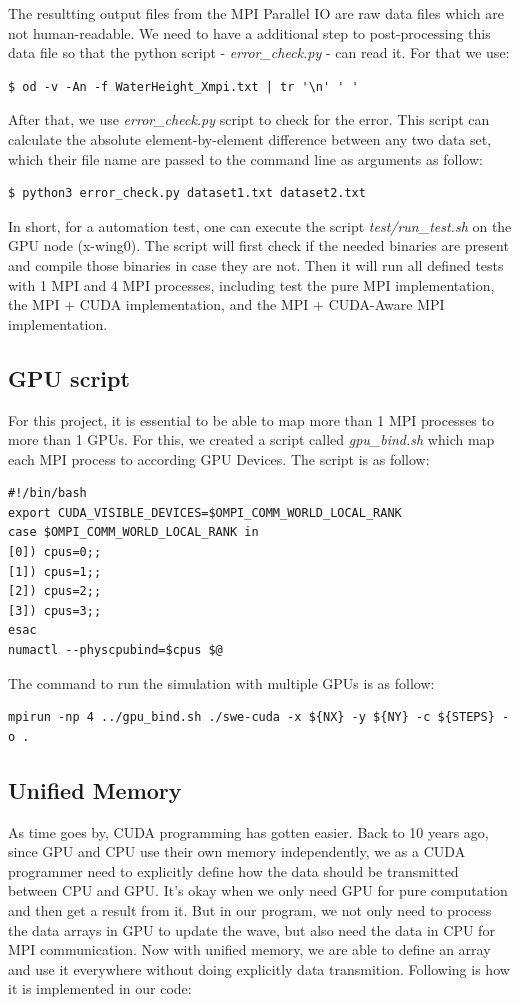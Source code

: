 \documentclass[article]{scrartcl}
\begin{document}
The resultting output files from the MPI Parallel IO are raw data files which are not human-readable. We need to have a additional step to post-processing this data file so that the python script - \textit{error\_check.py} - can read it. For that we use:
\begin{lstlisting}
$ od -v -An -f WaterHeight_Xmpi.txt | tr '\n' ' '
\end{lstlisting}
After that, we use \textit{error\_check.py} script to check for the error. This script can calculate the absolute element-by-element difference between any two data set, which their file name are passed to the command line as arguments as follow:
\begin{lstlisting}
$ python3 error_check.py dataset1.txt dataset2.txt
\end{lstlisting}

In short, for a automation test, one can execute the script \textit{test/run\_test.sh} on the GPU node (x-wing0). The script will first check if the needed binaries are present and compile those binaries in case they are not. Then it will run all defined tests with 1 MPI and 4 MPI processes, including test the pure MPI implementation, the MPI + CUDA implementation, and the MPI + CUDA-Aware MPI implementation.

\subsection{GPU script}
For this project, it is essential to be able to map more than 1 MPI processes to more than 1 GPUs. For this, we created a script called \textit{gpu\_bind.sh} which map each MPI process to according GPU Devices. The script is as follow:
\begin{lstlisting}[frame=single, label={gpu_script}]
#!/bin/bash
export CUDA_VISIBLE_DEVICES=$OMPI_COMM_WORLD_LOCAL_RANK
case $OMPI_COMM_WORLD_LOCAL_RANK in
[0]) cpus=0;;
[1]) cpus=1;;
[2]) cpus=2;;
[3]) cpus=3;;
esac
numactl --physcpubind=$cpus $@
\end{lstlisting}
The command to run the simulation with multiple GPUs is as follow:
\begin{lstlisting}
mpirun -np 4 ../gpu_bind.sh ./swe-cuda -x ${NX} -y ${NY} -c ${STEPS} -o .
\end{lstlisting}

\subsection{Unified Memory}
As time goes by, CUDA programming has gotten easier. Back to 10 years ago, since GPU and CPU use their own memory independently,
we as a CUDA programmer need to explicitly define how the data should be transmitted between CPU and GPU. 
It's okay when we only need GPU for pure computation and then get a result from it. But in our program, we not only need to process the data arrays
in GPU to update the wave, but also need the data in CPU for MPI communication. Now with unified memory,
we are able to define an array and use it everywhere without doing explicitly data transmition.
Following is how it is implemented in our code:
\end{document}
